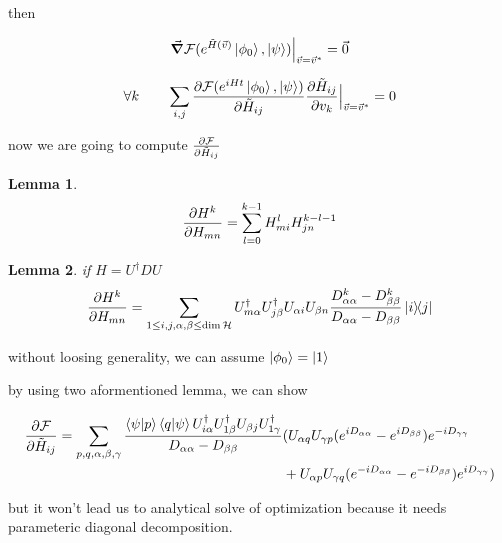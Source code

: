 \documentclass{article}
\begin{document}
then

\[\gradient \mathcal{F}(e^{\tilde{H}(\vec{v})} \ket{\phi_0}, \ket{\psi}) \Big|_{\vec{v} = \vec{v}^*} = \vec{0} \]

\[ \forall k \quad\quad \sum_{i,j} \pdv{\mathcal{F}(e^{iHt} \ket{\phi_0}, \ket{\psi})}{\tilde{H}_{ij}} \pdv{\tilde{H}_{ij}}{v_k}  \Big|_{\vec{v} = \vec{v}^*} = 0 \]

now we are going to compute $\pdv{\mathcal{F}}{\tilde{H}_{ij}}$

\newtheorem{lemma}{Lemma}
\begin{lemma}
\[ \pdv{H^k}{H_{mn}} = \sum_{l = 0}^{k-1} H^{l}_{mi} H^{k-l-1}_{jn} \]
\end{lemma}

\begin{lemma}
if
$H = U^\dagger D U$
\[ \pdv{H^k}{H_{mn}} = \sum_{1 \le i, j, \alpha,\beta \le \dim{\mathcal{H}}} U_{m\alpha}^\dagger U_{j\beta}^\dagger U_{\alpha i} U_{\beta n} \frac{D_{\alpha\alpha}^k - D_{\beta\beta}^k}{D_{\alpha\alpha} - D_{\beta\beta}} \dyad{i}{j} \] 
\end{lemma}

without loosing generality, we can assume $\ket{\phi_0} = \ket{1}$

by using two aformentioned lemma, we can show

\[ \begin{split} 
  \pdv{\mathcal{F}}{\tilde{H}_{ij}} = \sum_{p,q,\alpha,\beta,\gamma} \frac{\braket{\psi}{p}\braket{q}{\psi}U^\dagger_{i \alpha} U^\dagger_{1 \beta} U_{\beta j} U^\dagger_{1 \gamma}}{D_{\alpha\alpha} - D_{\beta\beta}} & ( U_{\alpha q} U_{\gamma p}(e^{iD_{\alpha\alpha}} - e^{iD_{\beta\beta}}) e^{-iD_{\gamma\gamma}} \\
   & + U_{\alpha p} U_{\gamma q} (e^{-iD_{\alpha\alpha}} - e^{-iD_{\beta\beta}}) e^{iD_{\gamma\gamma}} )
 \end{split} \]
 
 but it won't lead us to analytical solve of optimization because it needs parameteric diagonal decomposition.
\end{document}
